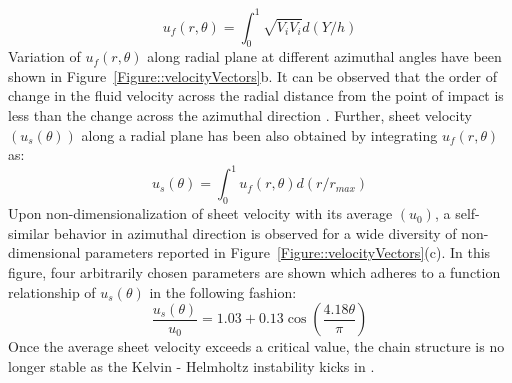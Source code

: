 \documentclass{jfm}
\begin{document}
\begin{equation}\label{Equation::uf}
u_f(r,\theta) = \int_{0}^{1}\sqrt{V_iV_i}d(Y/h)
\end{equation}
Variation of $u_f(r,\theta)$ along radial plane at different azimuthal angles have been shown in Figure~\ref{Figure::velocityVectors}b. It can be observed that the order of change in the fluid velocity across the radial distance from the point of impact is less than the change across the azimuthal direction \citep{choo2002velocity}. Further, sheet velocity $\left(u_s(\theta)\right)$ along a radial plane has been also obtained by integrating $u_f(r,\theta)$ as: %
\begin{equation}\label{Equation::us}
u_s(\theta) = \int_{0}^{1}u_f(r,\theta)d(r/r_{max})
\end{equation} 
Upon non-dimensionalization of sheet velocity with its average $\left(u_0\right)$, a self-similar behavior in azimuthal direction is observed for a wide diversity of non-dimensional parameters reported in Figure~\ref{Figure::velocityVectors}(c). In this figure, four arbitrarily chosen parameters are shown which adheres to a function relationship of $u_s(\theta)$ in the following fashion: 
\begin{equation}\label{Equation::usu0}
\frac{u_s(\theta)}{u_0} = 1.03 + 0.13\cos\left(\frac{4.18\theta}{\pi}\right)
\end{equation}
Once the average sheet velocity exceeds a critical value, the chain structure is no longer stable as the  Kelvin - Helmholtz instability kicks in \citep{villermaux2002life}. \\
\end{document}
